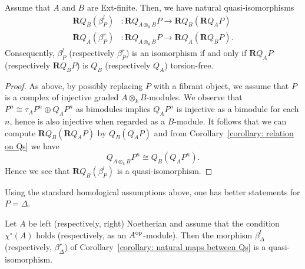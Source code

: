 \documentclass[dissertation.tex]{subfiles}
\begin{document}
\begin{proposition} \label{proposition: bi-torsion is a composition}
  Assume that \(A\) and \(B\) are Ext-finite. Then, we have natural quasi-isomorphisms 
  \begin{align*}
    \mathbf{R}Q_B(\beta^l_P) & : \mathbf{R}Q_{A \otimes_k B} P \to  \mathbf{R}Q_B(\mathbf{R}Q_A P) \\
    \mathbf{R}Q_A(\beta^r_P) & : \mathbf{R}Q_{A \otimes_k B} P \to  \mathbf{R}Q_A(\mathbf{R}Q_B P).
  \end{align*}
  Consequently, \(\beta^l_P\) (respectively \(\beta^r_P\)) is an isomorphism if and only if \(\mathbf{R}Q_A P\) (respectively \(\mathbf{R}Q_B P\)) is \(Q_B\) (respectively \(Q_A\)) torsion-free.
\end{proposition}


\begin{proof}
  As above, by possibly replacing \(P\) with a fibrant object, we assume that \(P\) is a complex of injective graded \(A \otimes_k B\)-modules.
  We observe that \(P^n \cong \tau_A P^n \oplus Q_A P^n\) as bimodules implies \(Q_A P^n\) is injective as a bimodule for each \(n\), hence is also injective when regarded as a \(B\)-module.
  It follows that we can compute \(\mathbf{R}Q_B(\mathbf{R}Q_A P)\) by \(Q_B(Q_A P)\)
  and from Corollary~\ref{corollary: relation on Qs} we have
  \[Q_{A \otimes_k B} P^n \cong Q_B(Q_A P^n).\]
  Hence we see that \(\mathbf{R}Q_B(\beta^l_P)\) is a quasi-isomorphism.
\end{proof}

Using the standard homological assumptions above, one has better statements for \(P = \Delta\). 

\begin{proposition} \label{proposition: when beta is an isomorphism}
  Let \(A\) be left (respectively, right) Noetherian and assume that the condition \(\chi^\circ(A)\) holds (respectively, as an \(A^{\operatorname{op}}\)-module).
  Then the morphism \(\beta^l_{\Delta}\) (respectively, \(\beta^r_{\Delta}\)) of Corollary~\ref{corollary: natural maps between Qs} is a quasi-isomorphism.
  
\end{proposition}
\end{document}
